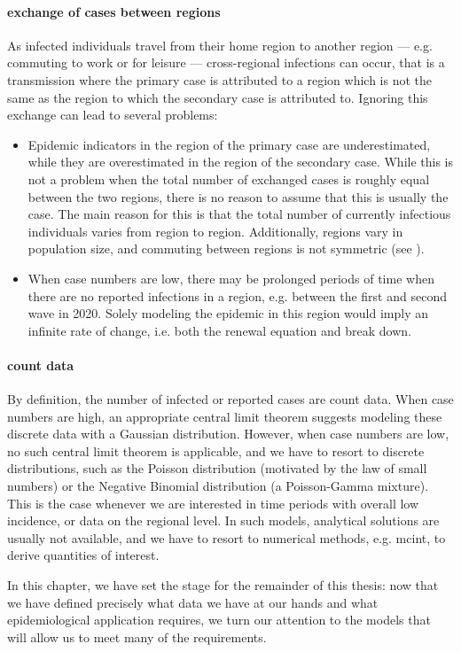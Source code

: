 \paragraph{exchange of cases between regions}
As infected individuals travel from their home region to another region --- e.g. commuting to work or for leisure --- cross-regional infections can occur, that is a transmission where the primary case is attributed to a region which is not the same as the region to which the secondary case is attributed to. Ignoring this exchange can lead to several problems:
\begin{itemize}
    \item Epidemic indicators in the region of the primary case are underestimated, while they are overestimated in the region of the secondary case. While this is not a problem when the total number of exchanged cases is roughly equal between the two regions, there is no reason to assume that this is usually the case.
    The main reason for this is that the total number of currently infectious individuals varies from region to region. Additionally, regions vary in population size, and commuting between regions is not symmetric (see ).
    \item When case numbers are low, there may be prolonged periods of time when there are no reported infections in a region, e.g. between the first and second wave in 2020. Solely modeling the epidemic in this region would imply an infinite rate of change, i.e. both the renewal equation  and  break down.
\end{itemize}

\paragraph{count data}
By definition, the number of infected or reported cases are count data. When case numbers are high, an appropriate central limit theorem suggests modeling these discrete data with a Gaussian distribution. However, when case numbers are low, no such central limit theorem is applicable, and we have to resort to discrete distributions, such as the Poisson distribution (motivated by the law of small numbers) or the Negative Binomial distribution (a Poisson-Gamma mixture). This is the case whenever we are interested in time periods with overall low incidence, or data on the regional level.
In such models, analytical solutions are usually not available, and we have to resort to numerical methods, e.g. \acrshort{mcint}, to derive quantities of interest.

In this chapter, we have set the stage for the remainder of this thesis: now that we have defined precisely what data we have at our hands and what epidemiological application requires, we turn our attention to the models that will allow us to meet many of the requirements.